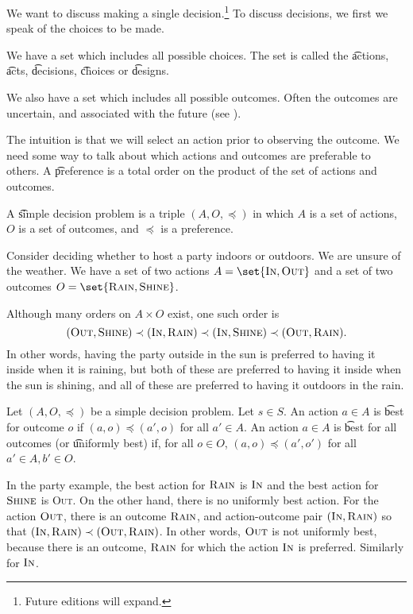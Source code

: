 

We want to discuss making a single decision.\footnote{Future editions will expand.}
To discuss decisions, we first we speak of the choices to be made.


We have a set which includes all possible choices.
The set is called the \t{actions}, \t{acts}, \t{decisions}, \t{choices} or \t{designs}.

We also have a set which includes all possible outcomes.
Often the outcomes are uncertain, and associated with the future (see ).

The intuition is that we will select an action prior to observing the outcome.
We need some way to talk about which actions and outcomes are preferable to others.
A \t{preference} is a total order on the product of the set of actions and outcomes.

A \t{simple decision problem} is a triple $(A, O, \preceq)$ in which $A$ is a set of actions, $O$ is a set of outcomes, and $\preceq$ is a preference.



Consider deciding whether to host a party indoors or outdoors.
We are unsure of the weather.
We have a set of two actions $A = \set{\textsc{In}, \textsc{Out}}$ and a set of two outcomes $O = \set{\textsc{Rain}, \textsc{Shine}}$.

Although many orders on $A \times O$ exist, one such order is
\[
	(\textsc{Out}, \textsc{Shine}) \prec (\textsc{In}, \textsc{Rain}) \prec (\textsc{In}, \textsc{Shine}) \prec (\textsc{Out}, \textsc{Rain}).
\]
In other words, having the party outside in the sun is preferred to having it inside when it is raining, but both of these are preferred to having it inside when the sun is shining, and all of these are preferred to having it outdoors in the rain.


Let $(A, O, \preceq)$ be a simple decision problem.
Let $s \in S$. 
An action $a \in A$ is \t{best for outcome $o$} if $(a, o) \preceq (a', o)$ for all $a' \in A$.
An action $a \in A$ is \t{best for all outcomes} (or \t{uniformly best}) if, for all $o \in O$, $(a, o) \preceq (a', o')$ for all $a' \in A, b' \in O$.

In the party example, the best action for $\textsc{Rain}$ is $\textsc{In}$ and the best action for $\textsc{Shine}$ is \textsc{Out}.
On the other hand, there is no uniformly best action.
For the action $\textsc{Out}$, there is an outcome $\textsc{Rain}$, and action-outcome pair $(\textsc{In}, \textsc{Rain})$ so that $(\textsc{In}, \textsc{Rain}) \prec (\textsc{Out}, \textsc{Rain})$.
In other words, $\textsc{Out}$ is not uniformly best, because there is an outcome, $\textsc{Rain}$ for which the action $\textsc{In}$ is preferred.
Similarly for $\textsc{In}$.